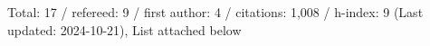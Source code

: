 Total: 17 / refereed: 9 / first author: 4 / citations: 1,008 / h-index: 9 (Last updated: 2024-10-21), List attached below